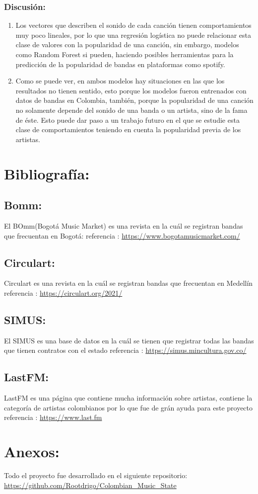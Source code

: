 \documentclass[11pt]{article}
\begin{document}
\subsubsection{Discusión:}
\label{sec:orge00ed05}
\begin{enumerate}
\item Los vectores que describen el sonido de cada canción tienen comportamientos muy poco lineales, por lo que una regresión logística no puede relacionar esta clase de valores con la popularidad de una canción, sin embargo, modelos como Random Forest si pueden, haciendo posibles herramientas para la predicción de la popularidad de bandas en plataformas como spotify.
\item Como se puede ver, en ambos modelos hay situaciones en las que los resultados no tienen sentido, esto porque los modelos fueron entrenados con datos de bandas en Colombia, también, porque la popularidad de una canción no solamente depende del sonido de una banda o un artista, sino de la fama de éste. Esto puede dar paso a un trabajo futuro en el que se estudie esta clase de comportamientos teniendo en cuenta la popularidad previa de los artistas.
\end{enumerate}




\section{Bibliografía:}
\label{sec:org03d1741}
\subsection{Bomm:}
\label{sec:orgd5b2342}
El BOmm(Bogotá Music Market) es una revista en la cuál se registran bandas que
frecuentan en Bogotá: referencia : \url{https://www.bogotamusicmarket.com/}
\subsection{Circulart:}
\label{sec:orgcb44059}
Circulart es una revista en la cuál se registran bandas que frecuentan en
Medellín referencia :  \url{https://circulart.org/2021/}
\subsection{SIMUS:}
\label{sec:org09787ec}
El SIMUS es una base de datos en la cuál se tienen que registrar todas las
bandas que tienen contratos con el estado referencia :
\url{https://simus.mincultura.gov.co/}
\subsection{LastFM:}
\label{sec:org841e416}
LastFM es una página que contiene mucha información sobre artistas, contiene la
categoría de artistas colombianos por lo que fue de grán ayuda para este
proyecto referencia : \url{https://www.last.fm}

\section{Anexos:}
\label{sec:org7b1b368}

Todo el proyecto fue desarrollado en el siguiente repositorio:
\url{https://github.com/Rootdrigo/Colombian\_Music\_State}
\end{document}
